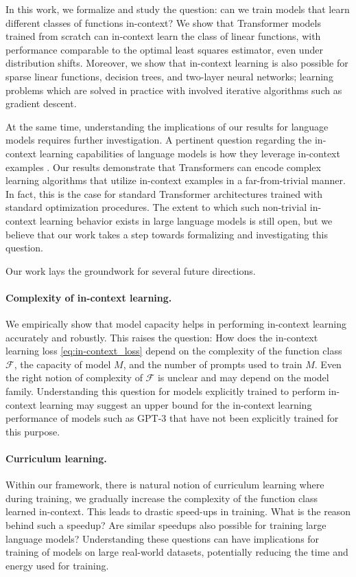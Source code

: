 In this work, we formalize and study the question: can we train models that learn different classes of functions in-context? We show that Transformer models trained from scratch can in-context learn the class of linear functions, with performance comparable to the optimal least squares estimator, even under distribution shifts. Moreover, we  show that in-context learning is also possible for sparse linear functions, decision trees, and two-layer neural networks; learning problems which are solved in practice with involved iterative algorithms such as gradient descent. %

At the same time, understanding the implications of our results for language models requires further investigation. A pertinent question regarding the in-context learning capabilities of language models is how they leverage in-context examples \citep{min2022rethinking}. Our results demonstrate that Transformers can encode complex learning algorithms that utilize in-context examples in a far-from-trivial manner. In fact, this is the case for standard Transformer architectures trained with standard optimization procedures. The extent to which such non-trivial in-context learning behavior exists in large language models is still open, but we believe that our work takes a step towards formalizing and investigating this question.

Our work lays the groundwork for several future directions.

\paragraph{Complexity of in-context learning.} We empirically show that model capacity helps in performing in-context learning accurately and robustly. This raises the question: How does the in-context learning loss \eqref{eq:in-context_loss} depend on the complexity of the function class $\mathcal{F}$, the capacity of model $M$, and the number of prompts used to train $M$. Even the right notion of complexity of $\mathcal{F}$ is unclear and may depend on the model family. Understanding this question for models explicitly trained to perform in-context learning may suggest an upper bound for the in-context learning performance of models such as GPT-3 that have not been explicitly trained for this purpose.

\paragraph{Curriculum learning.} Within our framework, there is natural notion of curriculum learning where during training, we gradually increase the complexity of the function class learned in-context. This leads to drastic speed-ups in training. What is the reason behind such a speedup? Are similar speedups also possible for training large language models? Understanding these questions can have implications for training of models on large real-world datasets, potentially reducing the time and energy used for training.

